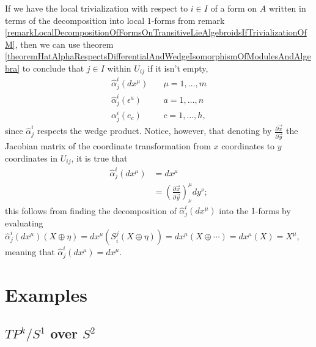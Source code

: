 \begin{remark}\label{remarkSufficesEnoughNeedOnlyHatAlphaFor1FormsToTranslateLocalTrivializations}
If we have the local trivialization with respect to $i \in I$ of a form on $A$ written in terms of the decomposition into local $1$-forms from remark \ref{remarkLocalDecompositionOfFormsOnTransitiveLieAlgebroidsIfTrivializationOfM}, then we can use theorem \ref{theoremHatAlphaRespectsDifferentialAndWedgeIsomorphismOfModulesAndAlgebra} to conclude that  $j \in I$ within $U_{ij}$ if it isn't empty,  
\begin{align}
    \hat \alpha^i_j(dx^\mu)& \quad \mu = 1, \dots, m \\ 
    \hat \alpha^i_j(\epsilon^a)& \quad a = 1, \dots, n \\
    \alpha^i_j(e_c)& \quad c = 1, \dots, h,
\end{align}
since $\hat \alpha^i_j$ respects the wedge product. Notice, however, that denoting by $\frac{\partial \vec x}{\partial \vec y}$ the Jacobian matrix of the coordinate transformation from $x$ coordinates to $y$ coordinates in $U_{ij}$, it is true that
\begin{align}
    \hat \alpha^i_j(dx^\mu) &= dx^\mu \\
    &= \left(\frac{\partial \vec x}{\partial \vec y}\right)^\mu_\nu dy^\nu;
\end{align}
this follows from finding the decomposition of $\hat \alpha^i_j(dx^\mu)$ into the $1$-forms by evaluating $\hat \alpha^i_j(dx^\mu)(X \oplus \eta) = dx^\mu(S^j_i(X \oplus \eta)) = dx^\mu(X \oplus \cdots) = dx^\mu(X) = X^\mu$, meaning that $\hat \alpha^i_j (dx^\mu) = dx^\mu$.
\end{remark}

\section{Examples}

\subsection{$TP^k/S^1$ over $S^2$} \label{exampleTransitionALphaFormsPk}

